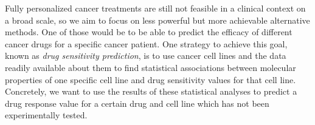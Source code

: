 Fully personalized cancer treatments are still not feasible in a clinical context on a broad scale, so we aim to focus on less powerful but more achievable alternative methods.
One of those would be to be able to predict the efficacy of different cancer drugs for a specific cancer patient.
One strategy to achieve this goal, known as \textit{drug sensitivity prediction}, is to use cancer cell lines and the data readily available about them to find statistical associations between molecular properties of one specific cell line and drug sensitivity values for that cell line.
Concretely, we want to use the results of these statistical analyses to predict a drug response value for a certain drug and cell line which has not been experimentally tested.


